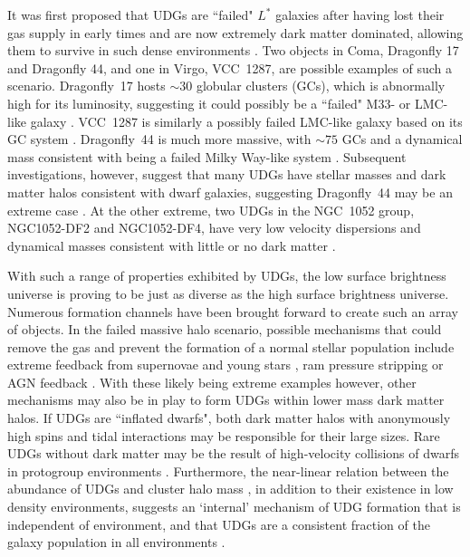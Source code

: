 \documentclass[iop,tighten,twocolumn,apj,floatfix]{emulateapj}
\begin{document}
It was first proposed that UDGs are ``failed" $L^*$ galaxies after
having lost their gas supply in early times and are now extremely dark matter
dominated, allowing them to survive in such dense environments
\citep{vandokkum2015a}.
Two objects in Coma, Dragonfly 17 and Dragonfly 44, and one in Virgo,
VCC~1287, are possible examples of such a scenario.
Dragonfly~17 hosts ${\sim}30$ globular clusters (GCs), which is abnormally high for its
luminosity, suggesting it could possibly be a ``failed" M33- or LMC-like galaxy
\citep{peng2016, beasley2016b}.
VCC~1287 is similarly a possibly failed LMC-like galaxy based on its GC
system \citep{beasley2016a}.
Dragonfly~44 is much more massive, with ${\sim}75$ GCs and a dynamical mass
consistent with being a failed Milky Way-like system \citep{vandokkum2016,
vandokkum2019b}.
Subsequent investigations, however, suggest that many UDGs have stellar masses and dark
matter halos consistent with dwarf galaxies, suggesting Dragonfly~44 may be an
extreme case \citep{beasley2016a, peng2016, amorisco2018, alabi2018,
ferre-mateu2018}.
At the other extreme, two UDGs in the NGC~1052 group, NGC1052-DF2 and
NGC1052-DF4, have very low velocity dispersions and dynamical masses
consistent with little or no dark matter \citep{vandokkum2018a, vandokkum2019a,
danieli2019a}.

With such a range of properties exhibited by UDGs, the low surface brightness universe is
proving to be just as diverse as the high surface brightness universe.
Numerous formation channels have been brought forward to create such an array of
objects.
In the failed massive halo scenario, possible mechanisms that could remove the
gas and prevent the formation of a normal stellar population include extreme
feedback from supernovae and young stars \citep{agertz2016, dicintio2017,
chan2018}, ram
pressure stripping \citep{yozin2015, jiang2019, tremmel2019} or AGN feedback
\citep{reines2013}.
With these likely being extreme examples however, other mechanisms may also be in
play to form UDGs within lower mass dark matter halos.  If UDGs are ``inflated
dwarfs", both dark matter halos with anonymously high spins
\citep{amorisco2016, rong2017, liao2019} and tidal interactions
\citep{yozin2015, jiang2019, liao2019, martin2019, sales2019} may be responsible for
their large sizes. 
Rare UDGs without dark matter may be the result of high-velocity collisions of
dwarfs in protogroup environments \citep{silk2019}.
Furthermore, the near-linear relation between the abundance of UDGs and
cluster halo mass \citep{vdb2016, roman2017b, vdb2017, janssens2017, mancerapina2018}, in
addition to their existence in low density environments, suggests an
`internal' mechanism of UDG formation that is independent of environment, and
that UDGs are a consistent fraction of the galaxy population in all
environments \citep{amorisco2018}.
\end{document}
